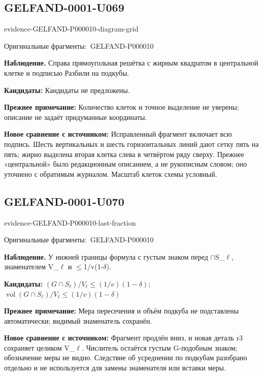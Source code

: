 \documentclass[11pt]{article}
\newcommand{\EvidenceBlock}[4]{%
 \par\smallskip\noindent\begin{minipage}{\linewidth}
 \begin{minipage}[t]{.47\linewidth}\vspace{0pt}\centering
 \csname evidence-#1-#2\endcsname\par
 {\scriptsize\SourceCropCaption\ #1}\par
 \end{minipage}\hfill
 \begin{minipage}[t]{.49\linewidth}\vspace{0pt}\raggedright
 {\small\color{orange!65!black}\textbf{#4} #3}\par
 \end{minipage}
 \end{minipage}\par\smallskip}
\newcommand{\SourceCropCaption}{Оригинальные фрагменты:}\newcommand{\ReadingCaption}{Сомнительное чтение.}\newcommand{\IncompleteCaption}{Неразобранный фрагмент.}\newcommand{\DiagramCaption}{Рисунок и набранное описание.}
\begin{document}
\subsection*{GELFAND-0001-U069}
\EvidenceBlock{GELFAND-P000010}{diagram-grid}{Справа прямоугольная решётка с жирным квадратом в центральной клетке и подписью Разбили на подкубы.}{Наблюдение.}
\par\smallskip\noindent\textbf{Кандидаты: } Кандидаты не предложены.\par
\par\smallskip\noindent\textbf{Прежнее примечание: } Количество клеток и точное выделение не уверены; описание не задаёт придуманные координаты.\par
\par\smallskip\noindent\textbf{Новое сравнение с источником: } Исправленный фрагмент включает всю подпись. Шесть вертикальных и шесть горизонтальных линий дают сетку пять на пять; жирно выделена вторая клетка слева в четвёртом ряду сверху. Прежнее «центральной» было редакционным описанием, а не рукописным словом; оно уточнено с обратимым журналом. Масштаб клеток схемы условный.\par

\subsection*{GELFAND-0001-U070}
\EvidenceBlock{GELFAND-P000010}{last-fraction}{У нижней границы формула с густым знаком перед \(\cap\)S\_\(\ell\), знаменателем V\_\(\ell\) и \(\le\)1/v(1-\(\delta\)).}{Наблюдение.}
\par\smallskip\noindent\textbf{Кандидаты: } \((G\cap S_\ell)/V_\ell\le(1/v)(1-\delta)\); \(\operatorname{vol}(G\cap S_\ell)/V_\ell\le(1/v)(1-\delta)\)\par
\par\smallskip\noindent\textbf{Прежнее примечание: } Мера пересечения и объём подкуба не подставлены автоматически; видимый знаменатель сохранён.\par
\par\smallskip\noindent\textbf{Новое сравнение с источником: } Фрагмент продлён вниз, и новая деталь r3 сохраняет целиком V\_\(\ell\). Числитель остаётся густым G-подобным знаком; обозначение меры не видно. Следствие об усреднении по подкубам разобрано отдельно и не используется для замены знаменателя или вставки меры.\par
\end{document}
